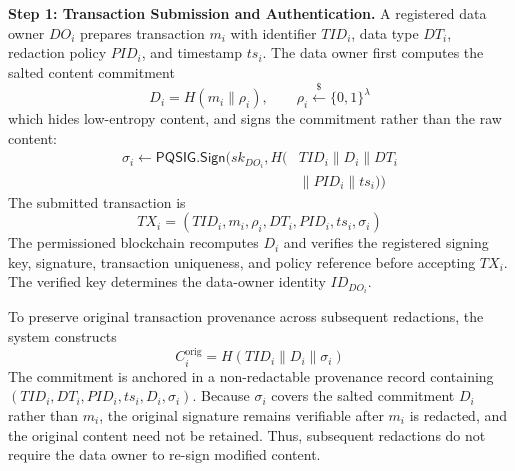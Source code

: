 \documentclass[lettersize,journal]{IEEEtran}
\begin{document}
    \medskip
    \noindent\textbf{Step 1: Transaction Submission and
    Authentication.}
    A registered data owner $DO_i$ prepares transaction
    $m_i$ with identifier $TID_i$, data type $DT_i$,
    redaction policy $PID_i$, and timestamp $ts_i$.
     {The data owner first computes the salted content commitment}
    \begin{equation}
    {D_i=H(m_i\parallel\rho_i),\qquad
    \rho_i\stackrel{\$}{\leftarrow}\{0,1\}^{\lambda}}
    \end{equation}
     {which hides low-entropy content, and signs the commitment
    rather than the raw content:}
    \begin{equation}
    \begin{aligned}
    \sigma_i\leftarrow
    \mathsf{PQSIG.Sign}\big(
    sk_{DO_i},H(&TID_i\parallel D_i\parallel DT_i\\
    &\parallel PID_i\parallel ts_i)\big)
    \end{aligned}
    \end{equation}
    The submitted transaction is
    \begin{equation}
    TX_i=(TID_i,m_i, {\rho_i,}DT_i,PID_i,ts_i,\sigma_i)
    \end{equation}
    The permissioned blockchain  {recomputes $D_i$ and} verifies the registered
    signing key, signature, transaction uniqueness, and
    policy reference before accepting $TX_i$. The
    verified key determines the data-owner identity
    $ID_{DO_i}$.
    
    To preserve original transaction provenance across
    subsequent redactions, the system constructs
    \begin{equation}
    {C_i^{\mathrm{orig}}=
    H(TID_i\parallel D_i\parallel\sigma_i)}
    \end{equation}
    The commitment is anchored in a non-redactable
    provenance record { containing
    $(TID_i,DT_i,PID_i,ts_i,D_i,\sigma_i)$}.
     {Because $\sigma_i$ covers the salted commitment $D_i$
    rather than $m_i$, the original signature remains verifiable after
    $m_i$ is redacted, and the original content need not be retained.}
    Thus, subsequent redactions do not require the
    data owner to re-sign modified content.
    
\end{document}
